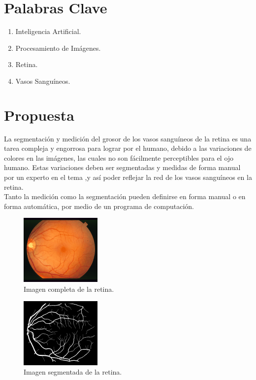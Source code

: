 \documentclass[14pt]{article}
\begin{document}
\section{Palabras Clave}
\begin{enumerate}
	\item Inteligencia Artificial.
	\item Procesamiento de Imágenes.
	\item Retina.
	\item Vasos Sanguíneos.

\end{enumerate}

\section{Propuesta}
La segmentación y medición del grosor de los vasos sanguíneos de la retina es una tarea compleja y engorrosa para lograr por el humano, debido a las variaciones de colores en las imágenes, las cuales no son fácilmente perceptibles para el ojo humano. Estas variaciones deben ser segmentadas  y medidas de forma manual por un experto en el tema ,y así poder reflejar la red de los vasos sanguíneos en la retina.\\%
Tanto la medición como la segmentación pueden definirse en forma manual o en forma automática, por medio de un programa de computación.\\%



\begin{figure}[h]
	\begin{center}
		\includegraphics[scale=0.5]{./Imagenes/Retina.png}
		\caption{Imagen completa de la retina.}
	\end{center}
\end{figure} 



\begin{figure}[h]
	\begin{center}
		\includegraphics[scale=.5]{./Imagenes/Retinasegmentada.png}
		\caption{Imagen segmentada de la retina.}
	\end{center}
\end{figure} 
\end{document}
